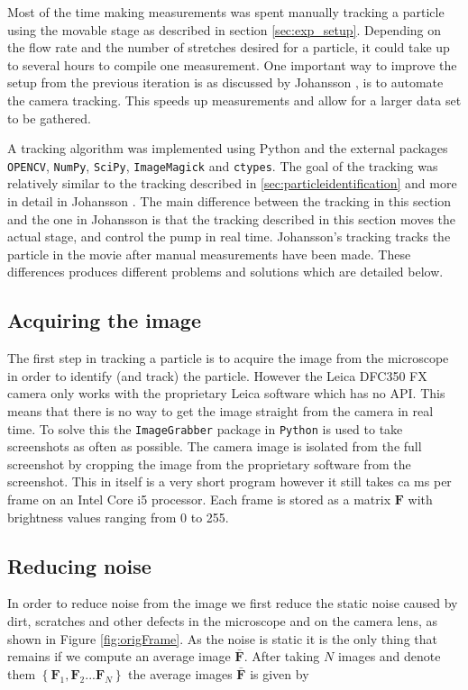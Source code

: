 %
%
%
%
%

Most of the time making measurements was spent manually tracking a particle using the movable stage as described in section \ref{sec:exp_setup}. Depending on the flow rate and the number of stretches desired for a particle, it could take up to several hours to compile one measurement. One important way to improve the setup from the previous iteration is as discussed by Johansson \cite{AntonThesis}, is to automate the camera tracking. This speeds up measurements and allow for a larger data set to be gathered.

A tracking algorithm was implemented using Python and the external packages \texttt{OPENCV}, \texttt{NumPy}, \texttt{SciPy}, \texttt{ImageMagick} and \texttt{ctypes}. The goal of the tracking was relatively similar to the tracking described in \ref{sec:particleidentification} and more in detail in Johansson \cite{AntonThesis}. The main difference between the tracking in this section and the one in Johansson is that the tracking described in this section moves the actual stage, and control the pump in real time. Johansson's tracking tracks the particle in the movie after manual measurements have been made. These differences produces different problems and solutions which are detailed below. 

\subsection{Acquiring the image}
The first step in tracking a particle is to acquire the image from the microscope in order to identify (and track) the particle. However the Leica DFC350 FX camera only works with the proprietary Leica software which has no API. This means that there is no way to get the image straight from the camera in real time. To solve this the \texttt{ImageGrabber} package in \texttt{Python} is used to take screenshots as often as possible. The camera image is isolated from the full screenshot by cropping the image from the proprietary software from the screenshot. This in itself is a very short program however it still takes ca \unit[50]{ms} per frame on an Intel Core i5 processor. Each frame is stored as a matrix $\mathbf{F}$ with brightness values ranging from 0 to 255.

\subsection{Reducing noise}
In order to reduce noise from the image we first reduce the static noise caused by dirt, scratches and other defects in the microscope and on the camera lens, as shown in Figure \ref{fig:origFrame}. As the noise is static it is the only thing that remains if we compute an average image $\bar{\mathbf{F}}$. After taking $N$ images and denote them $\left\{\mathbf{F}_1,\mathbf{F}_2 ... \mathbf{F}_N \right\}$ the average images $\bar{\mathbf{F}}$ is given by 

